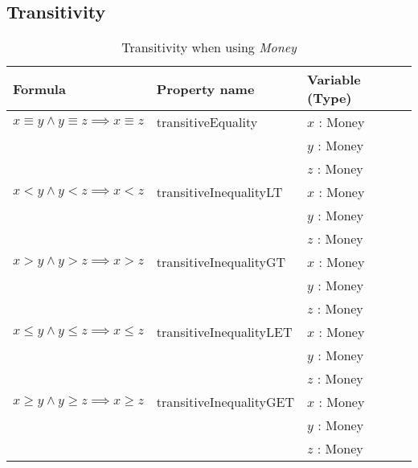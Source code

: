 \subsection*{Transitivity}
\label{ssct:properties_transitivity}
\begin{table}[!ht]
\centering
\begin{tabular}{lll}
\hline
                         \textbf{Formula}                                  & \textbf{Property name}  & \textbf{Variable (Type)} \\ \hline
\rowcolor[HTML]{EFEFEF}  $x \equiv y \land y \equiv z \implies x \equiv z$ & transitiveEquality      & $x$ : Money              \\
\rowcolor[HTML]{EFEFEF}                                                    &                         & $y$ : Money              \\
\rowcolor[HTML]{EFEFEF}                                                    &                         & $z$ : Money              \\
                         $x < y \land y < z \implies x < z$                & transitiveInequalityLT  & $x$ : Money              \\
                                                                           &                         & $y$ : Money              \\
                                                                           &                         & $z$ : Money              \\
\rowcolor[HTML]{EFEFEF}  $x > y \land y > z \implies x > z$                & transitiveInequalityGT  & $x$ : Money              \\
\rowcolor[HTML]{EFEFEF}                                                    &                         & $y$ : Money              \\
\rowcolor[HTML]{EFEFEF}                                                    &                         & $z$ : Money              \\
                         $x \leq y \land y \leq z \implies x \leq z$       & transitiveInequalityLET & $x$ : Money              \\
                                                                           &                         & $y$ : Money              \\
                                                                           &                         & $z$ : Money              \\
\rowcolor[HTML]{EFEFEF}  $x \geq y \land y \geq z \implies x \geq z$       & transitiveInequalityGET & $x$ : Money              \\
\rowcolor[HTML]{EFEFEF}                                                    &                         & $y$ : Money              \\
\rowcolor[HTML]{EFEFEF}                                                    &                         & $z$ : Money              \\ \hline
\end{tabular}
\caption{Transitivity when using \textit{Money}}
\label{tbl:ch4_money_transitivity}
\end{table}
